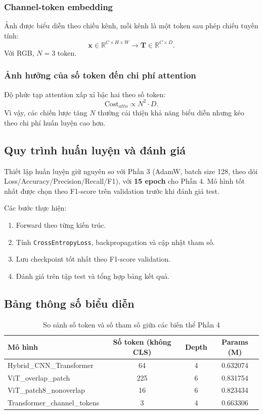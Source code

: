 \subsubsection{Channel-token embedding}
Ảnh được biểu diễn theo chiều kênh, mỗi kênh là một token sau phép chiếu tuyến tính:
\[
\mathbf{x}\in\mathbb{R}^{C\times H\times W}
\rightarrow
\mathbf{T}\in\mathbb{R}^{C\times D}.
\]
Với RGB, \(N=3\) token.

\subsubsection{Ảnh hưởng của số token đến chi phí attention}
Độ phức tạp attention xấp xỉ bậc hai theo số token:
\[
\mathrm{Cost}_{attn} \propto N^2\cdot D.
\]
Vì vậy, các chiến lược tăng \(N\) thường cải thiện khả năng biểu diễn nhưng kéo theo chi phí huấn luyện cao hơn.

\subsection{Quy trình huấn luyện và đánh giá}
Thiết lập huấn luyện giữ nguyên so với Phần 3 (AdamW, batch size 128, theo dõi Loss/Accuracy/Precision/Recall/F1), với \textbf{15 epoch} cho Phần 4. Mô hình tốt nhất được chọn theo F1-score trên validation trước khi đánh giá test.

Các bước thực hiện:
\begin{enumerate}
    \item Forward theo từng kiến trúc.
    \item Tính \texttt{CrossEntropyLoss}, backpropagation và cập nhật tham số.
    \item Lưu checkpoint tốt nhất theo F1-score validation.
    \item Đánh giá trên tập test và tổng hợp bảng kết quả.
\end{enumerate}

\subsection{Bảng thông số biểu diễn}
\begin{table}[H]
	\centering
	\begin{tabular}{lccc}
		\hline
		\textbf{Mô hình} & \textbf{Số token (không CLS)} & \textbf{Depth} & \textbf{Params (M)} \\
		\hline
		Hybrid\_CNN\_Transformer & 64  & 4 & 0.632074 \\
		ViT\_overlap\_patch & 225 & 6 & 0.831754 \\
		ViT\_patch8\_nonoverlap & 16 & 6 & 0.823434 \\
		Transformer\_channel\_tokens & 3 & 4 & 0.663306 \\
		\hline
	\end{tabular}
	\caption{So sánh số token và số tham số giữa các biến thể Phần 4}
	\label{tab:part4_repr}
\end{table}

